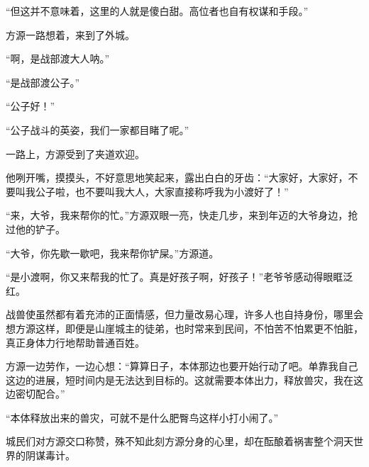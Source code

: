 \begin{this_body}
“但这并不意味着，这里的人就是傻白甜。高位者也自有权谋和手段。”

方源一路想着，来到了外城。

“啊，是战部渡大人呐。”

“是战部渡公子。”

“公子好！”

“公子战斗的英姿，我们一家都目睹了呢。”

一路上，方源受到了夹道欢迎。

他咧开嘴，摸摸头，不好意思地笑起来，露出白白的牙齿：“大家好，大家好，不要叫我公子啦，也不要叫我大人，大家直接称呼我为小渡好了！”

“来，大爷，我来帮你的忙。”方源双眼一亮，快走几步，来到年迈的大爷身边，抢过他的铲子。

“大爷，你先歇一歇吧，我来帮你铲屎。”方源道。

“是小渡啊，你又来帮我的忙了。真是好孩子啊，好孩子！”老爷爷感动得眼眶泛红。

战兽使虽然都有着充沛的正面情感，但力量改易心理，许多人也自持身份，哪里会想方源这样，即便是山崖城主的徒弟，也时常来到民间，不怕苦不怕累更不怕脏，真正身体力行地帮助普通百姓。

方源一边劳作，一边心想：“算算日子，本体那边也要开始行动了吧。单靠我自己这边的进展，短时间内是无法达到目标的。这就需要本体出力，释放兽灾，我在这边密切配合。”

“本体释放出来的兽灾，可就不是什么肥臀鸟这样小打小闹了。”

城民们对方源交口称赞，殊不知此刻方源分身的心里，却在酝酿着祸害整个洞天世界的阴谋毒计。

\end{this_body}

